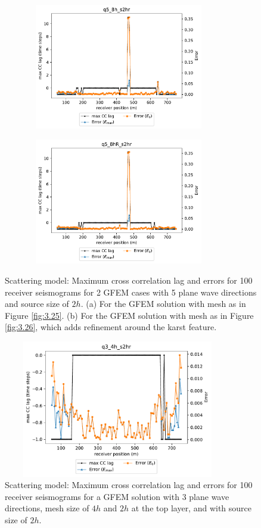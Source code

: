  \begin{figure}[h!]
 		\centering
		\begin{subfigure}{8cm}
				\includegraphics[width=8cm, height=5.5cm]{Thesis_Edith/figures/scattering/scat_waves/Err_q5_8h_s2hr.pdf}
			     \caption{}
		\end{subfigure}
        \hspace{0.25cm}	
		\begin{subfigure}{8cm}
				\includegraphics[width=8cm, height=5.5cm]{Thesis_Edith/figures/scattering/scat_waves/Err_q5_8hR_s2hr.pdf}
			   \caption{}
		\end{subfigure}
 
	\caption{Scattering model: Maximum cross correlation lag and errors for 100 receiver seismograms for 2 GFEM cases with 5 plane wave directions and source size of $2h$. (a) For the GFEM solution with mesh as in Figure \ref{fig:3.25}. (b) For the GFEM solution with mesh as in Figure \ref{fig:3.26}, which adds refinement around the karst feature.}
	\label{fig:3.34}
\end{figure}


 \begin{figure}[h!]
	\centering
	\includegraphics[width=10cm, height=6cm]{Thesis_Edith/figures/scattering/scat_waves/Err_q3_4h_s2hr.pdf}
	\caption{Scattering model: Maximum cross correlation lag and errors for 100 receiver seismograms for a GFEM solution with 3 plane wave directions, mesh size of $4h$ and $2h$ at the top layer, and with source size of $2h$.}
	\label{fig:3.35}
\end{figure}

